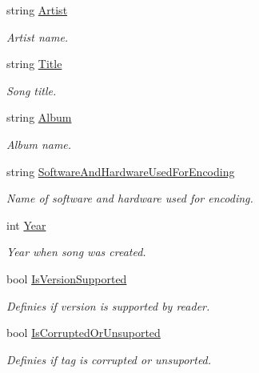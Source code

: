 \begin{DoxyCompactItemize}
string \mbox{\hyperlink{classOSML_1_1Media_1_1Metadata_1_1ID3_1_1ID3V2_a868e3582fd175549dd4b71f78fddd530}{Artist}}
\begin{DoxyCompactList}\small\item\em Artist name. \end{DoxyCompactList}\item 
string \mbox{\hyperlink{classOSML_1_1Media_1_1Metadata_1_1ID3_1_1ID3V2_abb4a4326c289f867bbb3b144e09caf17}{Title}}
\begin{DoxyCompactList}\small\item\em Song title. \end{DoxyCompactList}\item 
string \mbox{\hyperlink{classOSML_1_1Media_1_1Metadata_1_1ID3_1_1ID3V2_a69a918dd76e988e63ae800b44505c16f}{Album}}
\begin{DoxyCompactList}\small\item\em Album name. \end{DoxyCompactList}\item 
string \mbox{\hyperlink{classOSML_1_1Media_1_1Metadata_1_1ID3_1_1ID3V2_ac60cefe665d77d58ba65c1af5e19794e}{Software\+And\+Hardware\+Used\+For\+Encoding}}
\begin{DoxyCompactList}\small\item\em Name of software and hardware used for encoding. \end{DoxyCompactList}\item 
int \mbox{\hyperlink{classOSML_1_1Media_1_1Metadata_1_1ID3_1_1ID3V2_ad128d12ff2045726f105fb89e6630e12}{Year}}
\begin{DoxyCompactList}\small\item\em Year when song was created. \end{DoxyCompactList}\item 
bool \mbox{\hyperlink{classOSML_1_1Media_1_1Metadata_1_1ID3_1_1ID3V2_a11705224aca5af5172ab5c69d0b6cefa}{Is\+Version\+Supported}}
\begin{DoxyCompactList}\small\item\em Definies if version is supported by reader. \end{DoxyCompactList}\item 
bool \mbox{\hyperlink{classOSML_1_1Media_1_1Metadata_1_1ID3_1_1ID3V2_a03101364b7b7c2046f63b97ba50c8593}{Is\+Corrupted\+Or\+Unsuported}}
\begin{DoxyCompactList}\small\item\em Definies if tag is corrupted or unsuported. \end{DoxyCompactList}\end{DoxyCompactItemize}


